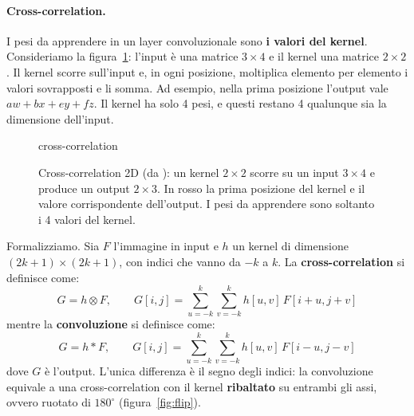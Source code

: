 \paragraph{Cross-correlation.}
I pesi da apprendere in un layer convoluzionale sono \textbf{i valori del kernel}. Consideriamo la figura~\ref{fig:cross-corr}: l'input è una matrice $3 \times 4$ e il kernel una matrice $2 \times 2$. Il kernel scorre sull'input e, in ogni posizione, moltiplica elemento per elemento i valori sovrapposti e li somma. Ad esempio, nella prima posizione l'output vale $aw + bx + ey + fz$. Il kernel ha solo 4 pesi, e questi restano 4 qualunque sia la dimensione dell'input.

\begin{figure}[htbp]
\centering
\begin{widget}{cross-correlation}
\end{widget}
\caption{Cross-correlation 2D (da \cite{Goodfellow-et-al-2016}): un kernel $2 \times 2$ scorre su un input $3 \times 4$ e produce un output $2 \times 3$. In rosso la prima posizione del kernel e il valore corrispondente dell'output. I pesi da apprendere sono soltanto i 4 valori del kernel.}
\label{fig:cross-corr}
\end{figure}

Formalizziamo. Sia $F$ l'immagine in input e $h$ un kernel di dimensione $(2k+1) \times (2k+1)$, con indici che vanno da $-k$ a $k$. La \textbf{cross-correlation} si definisce come:
\[
G = h \otimes F, \qquad G[i, j] = \sum_{u=-k}^{k}\sum_{v=-k}^{k} h[u, v]\, F[i + u, j + v]
\]
mentre la \textbf{convoluzione} si definisce come:
\[
G = h * F, \qquad G[i, j] = \sum_{u=-k}^{k}\sum_{v=-k}^{k} h[u, v]\, F[i - u, j - v]
\]
dove $G$ è l'output. L'unica differenza è il segno degli indici: la convoluzione equivale a una cross-correlation con il kernel \textbf{ribaltato} su entrambi gli assi, ovvero ruotato di $180^\circ$ (figura~\ref{fig:flip}).

